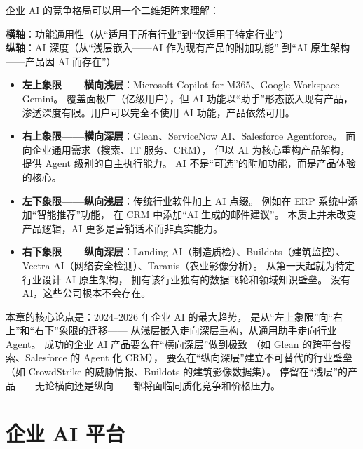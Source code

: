 \begin{corebox}
企业 AI 的竞争格局可以用一个二维矩阵来理解：

\medskip
\noindent
\textbf{横轴}：功能通用性（从``适用于所有行业''到``仅适用于特定行业''）\\
\textbf{纵轴}：AI 深度（从``浅层嵌入——AI 作为现有产品的附加功能''
到``AI 原生架构——产品因 AI 而存在''）

\begin{itemize}[noitemsep]
  \item \textbf{左上象限——横向浅层}：Microsoft Copilot for M365、Google Workspace Gemini。
        覆盖面极广（亿级用户），但 AI 功能以``助手''形态嵌入现有产品，
        渗透深度有限。用户可以完全不使用 AI 功能，产品依然可用。
  \item \textbf{右上象限——横向深层}：Glean、ServiceNow AI、Salesforce Agentforce。
        面向企业通用需求（搜索、IT 服务、CRM），
        但以 AI 为核心重构产品架构，提供 Agent 级别的自主执行能力。
        AI 不是``可选''的附加功能，而是产品体验的核心。
  \item \textbf{左下象限——纵向浅层}：传统行业软件加上 AI 点缀。
        例如在 ERP 系统中添加``智能推荐''功能，
        在 CRM 中添加``AI 生成的邮件建议''。
        本质上并未改变产品逻辑，AI 更多是营销话术而非真实能力。
  \item \textbf{右下象限——纵向深层}：Landing AI（制造质检）、Buildots（建筑监控）、
        Vectra AI（网络安全检测）、Taranis（农业影像分析）。
        从第一天起就为特定行业设计 AI 原生架构，
        拥有该行业独有的数据飞轮和领域知识壁垒。
        没有 AI，这些公司根本不会存在。
\end{itemize}

本章的核心论点是：2024--2026 年企业 AI 的最大趋势，
是从``左上象限''向``右上''和``右下''象限的迁移——
从浅层嵌入走向深层重构，从通用助手走向行业 Agent。
成功的企业 AI 产品要么在``横向深层''做到极致
（如 Glean 的跨平台搜索、Salesforce 的 Agent 化 CRM），
要么在``纵向深层''建立不可替代的行业壁垒
（如 CrowdStrike 的威胁情报、Buildots 的建筑影像数据集）。
停留在``浅层''的产品——无论横向还是纵向——都将面临同质化竞争和价格压力。
\end{corebox}


\section{企业 AI 平台}
\label{sec:ent-platforms}

